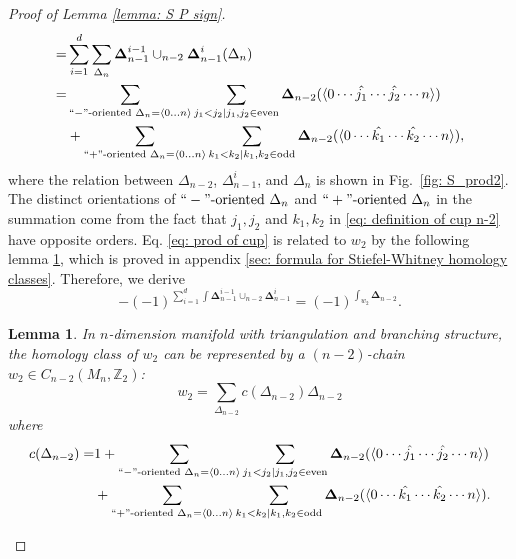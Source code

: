 \documentclass[12pt]{article}
\newtheorem{lemma}{Lemma}
\newcommand{\ZZ}{{\mathbb Z}}
\begin{document}
\begin{proof}[Proof of Lemma \ref{lemma: S P sign}]
\begin{equation}
\begin{split}
        =& \sum^d_{i=1} \sum_{\Delta_n} \boldsymbol \Delta^{i-1}_{n-1} \cup_{n-2} \boldsymbol \Delta^{i}_{n-1} (\Delta_n) \\
        =& \sum_{``-"\text{-oriented } \Delta_n = \langle 0 \dots n \rangle } \sum_{j_1 < j_2 | j_1, j_2 \in \text{even}} \boldsymbol \Delta_{n-2} ( \langle 0 \cdots \hat{j_1} \cdots \hat{j_2} \cdots n \rangle) \\
        &+ \sum_{``+"\text{-oriented } \Delta_n = \langle 0 \dots n \rangle } \sum_{k_1 < k_2 | k_1, k_2 \in \text{odd}} \boldsymbol \Delta_{n-2} ( \langle 0 \cdots \hat{k_1} \cdots \hat{k_2} \cdots n \rangle),
    \end{split}
    \label{eq: prod of cup}
\end{equation}
where the relation between $\Delta_{n-2}$, $\Delta^i_{n-1}$, and $\Delta_n$ is shown in Fig.~\ref{fig: S_prod2}. The distinct orientations of $``-"\text{-oriented } \Delta_n$ and $``+"\text{-oriented } \Delta_n$ in the summation come from the fact that $j_1,j_2$ and $k_1,k_2$ in \eqref{eq: definition of cup n-2} have opposite orders.
Eq. \eqref{eq: prod of cup} is related to $w_2$ by the following lemma \ref{lemma: w2}, which is proved in appendix \ref{sec: formula for Stiefel-Whitney homology classes}. Therefore, we derive
\begin{equation}
    -(-1)^{\sum^d_{i=1} \int \boldsymbol \Delta^{i-1}_{n-1} \cup_{n-2} \boldsymbol \Delta^{i}_{n-1} } = (-1)^{\int_{w_2} \boldsymbol \Delta_{n-2} }.
\end{equation}

\begin{lemma}
    In $n$-dimension manifold with triangulation and branching structure, the homology class of $w_2$ can be represented by a $(n-2)$-chain $w_2 \in C_{n-2}(M_n, \ZZ_2)$:
    \begin{equation}
        w_2 = \sum_{\Delta_{n-2}} c(\Delta_{n-2}) \Delta_{n-2}
    \end{equation}
    where
    \begin{equation}
        \begin{split}
            c(\Delta_{n-2}) =& 1 + \sum_{``-"\text{-oriented } \Delta_n = \langle 0 \dots n \rangle } \sum_{j_1 < j_2 | j_1, j_2 \in \text{even}} \boldsymbol \Delta_{n-2} ( \langle 0 \cdots \hat{j_1} \cdots \hat{j_2} \cdots n \rangle) \\
            &+ \sum_{``+"\text{-oriented } \Delta_n = \langle 0 \dots n \rangle } \sum_{k_1 < k_2 | k_1, k_2 \in \text{odd}} \boldsymbol \Delta_{n-2} ( \langle 0 \cdots \hat{k_1} \cdots \hat{k_2} \cdots n \rangle).
        \end{split}
    \label{eq: c Delta}
    \end{equation}
\label{lemma: w2}
\end{lemma}
\end{proof}
\end{document}
